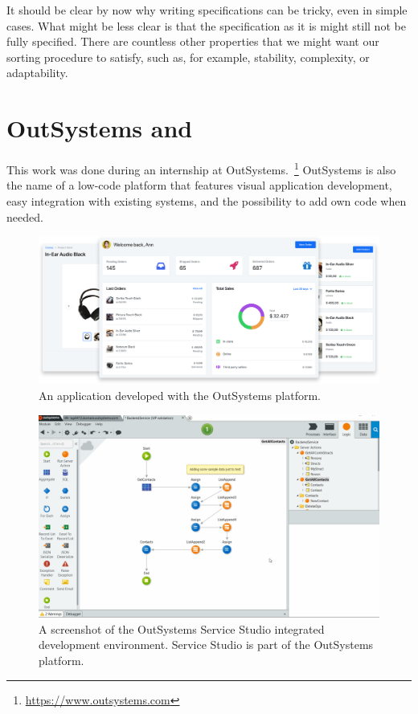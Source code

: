 It should be clear by now why writing specifications can be tricky, even in
simple cases.
What might be less clear is that the specification as it is might still not be
fully specified.
There are countless other properties that we might want our sorting procedure to
satisfy, such as, for example, stability, complexity, or adaptability.

\section{OutSystems and }
\label{sec:outsystems-pbe}

This work was done during an internship at
OutSystems.~\footnote{\url{https://www.outsystems.com}} 
OutSystems is also the name of a low-code platform that features visual
application development, easy integration with existing systems, and the
possibility to add own code when needed.

\begin{figure}
  \centering
  \includegraphics[width=1.0\textwidth]{assets/outsystems-app.png}
  \caption{An application developed with the OutSystems platform.}
\end{figure}

\begin{figure}
  \centering
  \includegraphics[width=1.0\textwidth]{assets/outsystems-studio.png}
  \caption{A screenshot of the OutSystems Service Studio integrated development
    environment. Service Studio is part of the OutSystems platform.}
\end{figure}

